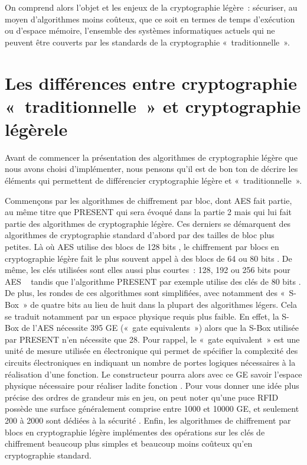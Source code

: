 	On comprend alors l’objet et les enjeux de la cryptographie légère : sécuriser, au moyen d’algorithmes moins coûteux, que ce soit en termes de temps d’exécution ou d’espace mémoire,
	l’ensemble des systèmes informatiques actuels qui ne peuvent être couverts par les standards de la cryptographie « traditionnelle ».

	\section{Les différences entre cryptographie « traditionnelle » et cryptographie légèrele}

	Avant de commencer la présentation des algorithmes de cryptographie légère que nous avons choisi d’implémenter,
	nous pensons qu’il est de bon ton de décrire les éléments qui permettent de différencier cryptographie légère et « traditionnelle ».

	Commençons par les algorithmes de chiffrement par bloc, dont AES fait partie,
	au même titre que PRESENT qui sera évoqué dans la partie 2 mais qui lui fait partie des algorithmes de cryptographie légère.
	Ces derniers se démarquent des algorithmes de cryptographie standard d’abord par des tailles de bloc plus petites. Là où AES utilise des blocs de 128 bits \cite{AES-FIPS},
	le chiffrement par blocs en cryptographie légère fait le plus souvent appel à des blocs de 64 ou 80 bits \cite{Report_light}.
	De même, les clés utilisées sont elles aussi plus courtes : 128, 192 ou 256 bits pour AES \cite{AES-FIPS}  tandis que l’algorithme PRESENT par exemple utilise des clés de 80 bits \cite{PRESENT}.
	De plus, les rondes de ces algorithmes sont simplifiées, avec notamment des « S-Box » de quatre bits au lieu de huit dans la plupart des algorithmes légers.
	Cela se traduit notamment par un espace physique requis plus faible.
	En effet, la S-Box de l’AES nécessite 395 GE \cite{RFID} (« gate equivalents ») alors que la S-Box utilisée par PRESENT n’en nécessite que 28.
	Pour rappel, le « gate equivalent » est une unité de mesure utilisée en électronique qui permet de spécifier la complexité des circuits électroniques en indiquant un nombre de portes logiques nécessaires à la réalisation d’une fonction.
	Le constructeur pourra alors avec ce GE savoir l’espace physique nécessaire pour réaliser ladite fonction \cite{wiki_gate}.
	Pour vous donner une idée plus précise des ordres de grandeur mis en jeu, on peut noter qu’une puce RFID possède une surface généralement comprise entre 1000 et 10000 GE,
	et seulement 200 à 2000 sont dédiées à la sécurité \cite{Report_light}. Enfin, les algorithmes de chiffrement par blocs en cryptographie légère implémentes des opérations sur les clés de chiffrement beaucoup plus simples et beaucoup moins coûteux qu’en cryptographie standard.

